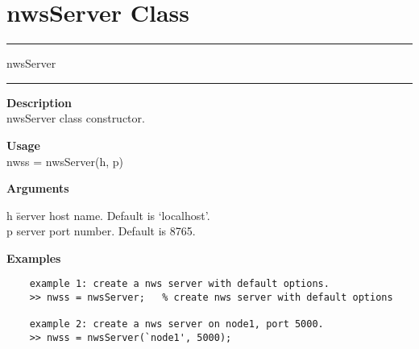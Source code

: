 \section {nwsServer Class}
\rule[0.1in]{6in}{0.01in}
\newline
nwsServer
\newline
\rule{6in}{0.01in}
\begin{list}{}{}
	\item {\bf Description}\\
	nwsServer class constructor.
	\item {\bf Usage}\\
	nwss = nwsServer(h, p)
	\item {\bf Arguments}
		\begin{tabbing}
		h \hspace{2.5cm} \= server host name. Default is `localhost'.\\
		p \> server port number. Default is 8765.
		\end{tabbing}
	\item {\bf Examples}
	\begin{verbatim}
	example 1: create a nws server with default options.
	>> nwss = nwsServer;   % create nws server with default options
	
	example 2: create a nws server on node1, port 5000.
	>> nwss = nwsServer(`node1', 5000);
	\end{verbatim}
\end{list}


